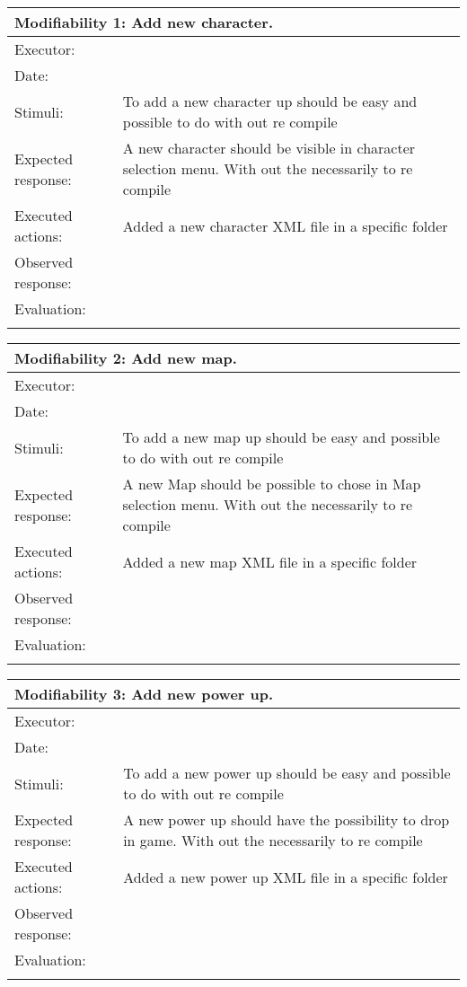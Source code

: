 

\begin{tabular}{|p{3.5cm}|p{7.5cm}|}
\hline
\multicolumn{2}{|l|}{Modifiability 1: Add new character.}\\
\hline
Executor: 					& \\   
Date:    						& \\ 			
Stimuli:     				& To add a new character up should be easy and possible to do with out re compile\\
Expected response:  & A new character should be visible in character selection menu. With out the necessarily to re compile\\
Executed actions:   & Added a new character XML file in a specific folder\\
Observed response:  & \\ 
Evaluation:    			& \\ 
\hline
\multicolumn{2}{l}{ }\\
\end{tabular}


\begin{tabular}{|p{3.5cm}|p{7.5cm}|}
\hline
\multicolumn{2}{|l|}{Modifiability 2: Add new map.}\\
\hline
Executor: 					& \\   
Date:    						& \\ 			
Stimuli:     				& To add a new map up should be easy and possible to do with out re compile\\
Expected response:  & A new Map should be possible to chose in Map selection menu. With out the necessarily to re compile\\
Executed actions:   & Added a new map XML file in a specific folder\\
Observed response:  & \\ 
Evaluation:    			& \\ 
\hline
\multicolumn{2}{l}{ }\\
\end{tabular}


\begin{tabular}{|p{3.5cm}|p{7.5cm}|}
\hline
\multicolumn{2}{|l|}{Modifiability 3: Add new power up.}\\
\hline
Executor: 					& \\   
Date:    						& \\ 			
Stimuli:     				& To add a new power up should be easy and possible to do with out re compile\\
Expected response:  & A new power up should have the possibility to drop in game. With out the necessarily to re compile\\
Executed actions:   & Added a new power up XML file in a specific folder\\
Observed response:  & \\ 
Evaluation:    			& \\ 
\hline
\multicolumn{2}{l}{ }\\
\end{tabular}


